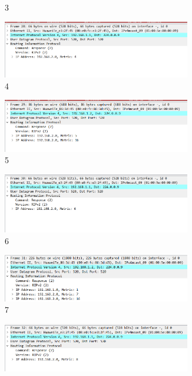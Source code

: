 \documentclass[a4paper,twoside]{article}
\begin{document}
\begin{spacing}{1.2}
\begin{figure}[bp]
\begin{subfigure}{0.4\textwidth}
		\caption{3}
		\label{fig:cti3}
	\end{subfigure}
	\begin{subfigure}{0.4\textwidth}
		\centering
		\includegraphics[width=0.9\textwidth]{4.png}
		\caption{4}
		\label{fig:cti4}
	\end{subfigure}
	\begin{subfigure}{0.4\textwidth}
		\centering
		\includegraphics[width=0.9\textwidth]{5.png}
		\caption{5}
		\label{fig:cti5}
	\end{subfigure}
	\begin{subfigure}{0.4\textwidth}
		\centering
		\includegraphics[width=0.9\textwidth]{6.png}
		\caption{6}
		\label{fig:cti6}
	\end{subfigure}
	\begin{subfigure}{0.4\textwidth}
		\centering
		\includegraphics[width=0.9\textwidth]{7.png}
		\caption{7}
		\label{fig:cti7}
	\end{subfigure}
	\begin{subfigure}{0.4\textwidth}
		\centering
		\includegraphics[width=0.9\textwidth]{8.png}

\end{subfigure}
\end{figure}
\end{spacing}
\end{document}
